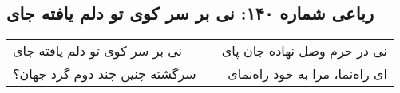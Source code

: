 \begin{center}
\section*{رباعی شماره ۱۴۰: نی بر سر کوی تو دلم یافته جای}
\label{sec:140}
\begin{longtable}{l p{0.5cm} r}
نی بر سر کوی تو دلم یافته جای
&&
نی در حرم وصل نهاده جان پای
\\
سرگشته چنین چند دوم گرد جهان؟
&&
ای راه‌نما، مرا به خود راه‌نمای
\\
\end{longtable}
\end{center}
